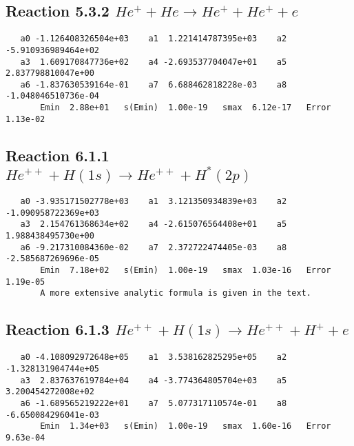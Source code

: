 \documentclass[12pt]{article}
\begin{document}
                               


\newpage
\subsection{
Reaction 5.3.2 $   He^+ + He \rightarrow He^+ + He^+ + e$}


\begin{small}\begin{verbatim}
   a0 -1.126408326504e+03    a1  1.221414787395e+03    a2 -5.910936989464e+02
   a3  1.609170847736e+02    a4 -2.693537704047e+01    a5  2.837798810047e+00
   a6 -1.837630539164e-01    a7  6.688462818228e-03    a8 -1.048046510736e-04
       Emin  2.88e+01   s(Emin)  1.00e-19   smax  6.12e-17   Error  1.13e-02
\end{verbatim}\end{small}

\newpage
\subsection{
Reaction 6.1.1 $   He^{++} + H(1s) \rightarrow He^{++} + H^*(2p)$}


\begin{small}\begin{verbatim}
   a0 -3.935171502778e+03    a1  3.121350934839e+03    a2 -1.090958722369e+03
   a3  2.154761368634e+02    a4 -2.615076564408e+01    a5  1.988438495730e+00
   a6 -9.217310084360e-02    a7  2.372722474405e-03    a8 -2.585687269696e-05
       Emin  7.18e+02   s(Emin)  1.00e-19   smax  1.03e-16   Error  1.19e-05
       A more extensive analytic formula is given in the text.
\end{verbatim}\end{small}

\newpage
\subsection{
Reaction 6.1.3 $   He^{++} + H(1s) \rightarrow He^{++} + H^+ + e$}


\begin{small}\begin{verbatim}
   a0 -4.108092972648e+05    a1  3.538162825295e+05    a2 -1.328131904744e+05
   a3  2.837637619784e+04    a4 -3.774364805704e+03    a5  3.200454272008e+02
   a6 -1.689565219222e+01    a7  5.077317110574e-01    a8 -6.650084296041e-03
       Emin  1.34e+03   s(Emin)  1.00e-19   smax  1.60e-16   Error 9.63e-04
\end{verbatim}\end{small}
\end{document}
